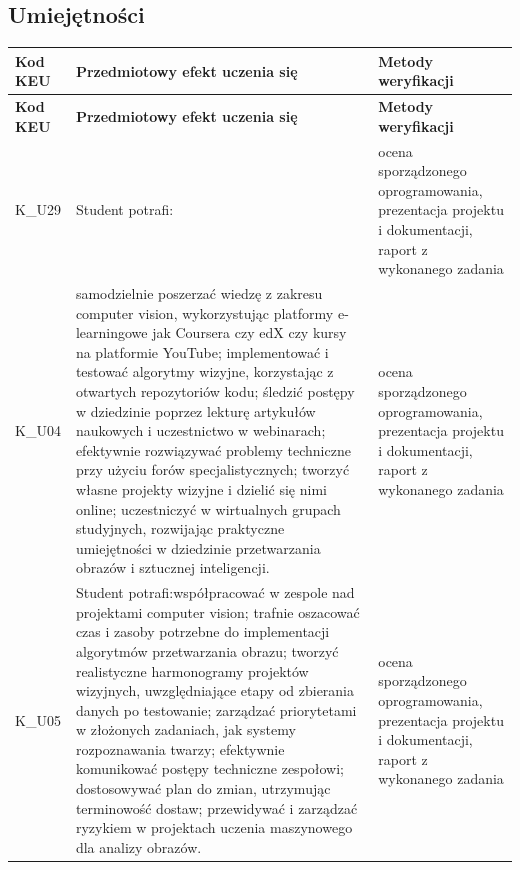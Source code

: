 \documentclass[12pt, a4paper]{article}
\newcommand{\thdrule}{\noalign{\global\setlength{\extrarowheight}{0pt}}}
\newcommand{\thdend}{\noalign{\global\setlength{\extrarowheight}{3pt}}}
\begin{document}
\subsection*{Umiejętności}
{\scriptsize
\begin{longtable}{m{1.6cm}m{9.0cm}m{4.2cm}}
\thdrule\toprule
\rowcolor{pjatkRed} {\color{white}\footnotesize\textbf{\vphantom{Ag}Kod KEU}} & {\color{white}\footnotesize\textbf{\vphantom{Ag}Przedmiotowy efekt uczenia się}} & {\color{white}\footnotesize\textbf{\vphantom{Ag}Metody weryfikacji}} \\
\midrule\thdend
\endfirsthead
\thdrule\toprule
\rowcolor{pjatkRed} {\color{white}\footnotesize\textbf{\vphantom{Ag}Kod KEU}} & {\color{white}\footnotesize\textbf{\vphantom{Ag}Przedmiotowy efekt uczenia się}} & {\color{white}\footnotesize\textbf{\vphantom{Ag}Metody weryfikacji}} \\
\midrule\thdend
\endhead
  \rowcolor{tableRowLight} K\_U29 & Student potrafi: & ocena sporządzonego oprogramowania, prezentacja projektu i dokumentacji, raport z wykonanego zadania \\
  \rowcolor{tableRowAlt} K\_U04 & samodzielnie poszerzać wiedzę z zakresu computer vision, wykorzystując platformy e-learningowe jak Coursera czy edX czy kursy na platformie YouTube; implementować i testować algorytmy wizyjne, korzystając z otwartych repozytoriów kodu; śledzić postępy w dziedzinie poprzez lekturę artykułów naukowych i uczestnictwo w webinarach; efektywnie rozwiązywać problemy techniczne przy użyciu forów specjalistycznych; tworzyć własne projekty wizyjne i dzielić się nimi online; uczestniczyć w wirtualnych grupach studyjnych, rozwijając praktyczne umiejętności w dziedzinie przetwarzania obrazów i sztucznej inteligencji. & ocena sporządzonego oprogramowania, prezentacja projektu i dokumentacji, raport z wykonanego zadania \\
  \rowcolor{tableRowLight} K\_U05 & Student potrafi:współpracować w zespole nad projektami computer vision; trafnie oszacować czas i zasoby potrzebne do implementacji algorytmów przetwarzania obrazu; tworzyć realistyczne harmonogramy projektów wizyjnych, uwzględniające etapy od zbierania danych po testowanie; zarządzać priorytetami w złożonych zadaniach, jak systemy rozpoznawania twarzy; efektywnie komunikować postępy techniczne zespołowi; dostosowywać plan do zmian, utrzymując terminowość dostaw; przewidywać i zarządzać ryzykiem w projektach uczenia maszynowego dla analizy obrazów. & ocena sporządzonego oprogramowania, prezentacja projektu i dokumentacji, raport z wykonanego zadania \\

\end{longtable}}
\end{document}
